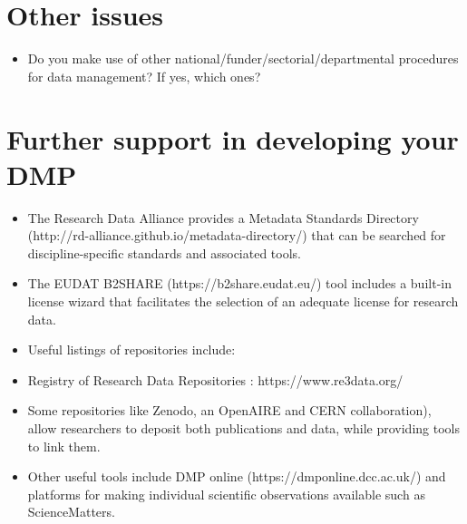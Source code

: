 \documentclass{article}
\begin{document}
\section{Other issues}
\begin{itemize}
    \item Do you make use of other national/funder/sectorial/departmental procedures for data management? If yes, which ones?
\end{itemize}


\section{Further support in developing your DMP}
\begin{itemize}
    \item The Research Data Alliance provides a Metadata Standards Directory (http://rd-alliance.github.io/metadata-directory/) that can be searched for discipline-specific standards and associated tools.
    \item The EUDAT B2SHARE (https://b2share.eudat.eu/) tool includes a built-in license wizard that facilitates the selection of an adequate license for research data.
    \item Useful listings of repositories include:
    \item Registry of Research Data Repositories : https://www.re3data.org/
    \item Some repositories like Zenodo, an OpenAIRE and CERN collaboration), allow researchers to deposit both publications and data, while providing tools to link them.
    \item Other useful tools include DMP online (https://dmponline.dcc.ac.uk/) and platforms for making individual scientific observations available such as ScienceMatters.
\end{itemize}
\end{document}
